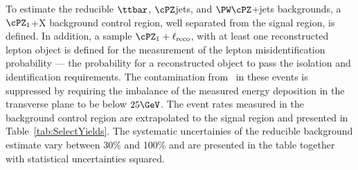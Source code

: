 To estimate the reducible 
$\ttbar$, $\cPZ$jets, and $\PW\cPZ$+jets
backgrounds, a $\cPZ_1$+X background control region, 
well separated from the signal region, is defined. 
In addition, a sample $\cPZ_1 + \ell_\text{reco}$, with at least one reconstructed lepton object is
defined for the measurement of the lepton misidentification probability --- the probability for a
reconstructed object to pass the isolation and identification requirements.
The contamination from \PW\cPZ\ in these events is suppressed by requiring the imbalance
of the measured energy deposition in the transverse plane to be below $25\GeV$.
The event rates measured in the background control region are extrapolated to the
signal region
and presented in Table~\ref{tab:SelectYields}. The systematic uncertainies of the 
reducible background estimate vary between 30\% and 100\% and are presented in the table 
together with statistical uncertainties squared. 


